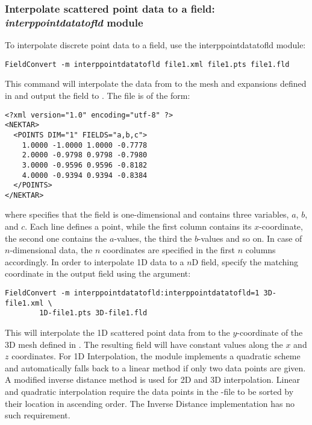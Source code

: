 \subsubsection{Interpolate scattered point data to a field: \textit{interppointdatatofld} module}
\label{s:utilities:fieldconvert:sub:interppointdatatofld}
To interpolate discrete point data to a field, use the interppointdatatofld module:
%
\begin{lstlisting}[style=BashInputStyle]
FieldConvert -m interppointdatatofld file1.xml file1.pts file1.fld
\end{lstlisting}
%
This command will interpolate the data from  to the mesh
and expansions defined in  and output the field to .
The file  is of the form:
%
\begin{lstlisting}[style=XMLStyle]
<?xml version="1.0" encoding="utf-8" ?>
<NEKTAR>
  <POINTS DIM="1" FIELDS="a,b,c">
    1.0000 -1.0000 1.0000 -0.7778
    2.0000 -0.9798 0.9798 -0.7980
    3.0000 -0.9596 0.9596 -0.8182
    4.0000 -0.9394 0.9394 -0.8384
  </POINTS>
</NEKTAR>
\end{lstlisting}
%
where  specifies that the field is one-dimensional
and contains three variables, $a$, $b$, and $c$.
Each line defines a point, while the  first column contains its $x$-coordinate,
the second one contains the $a$-values, the third the $b$-values and so on.
In case of $n$-dimensional data, the $n$ coordinates are specified in the first $n$
columns accordingly.
%
In order to interpolate 1D data to a $n$D field, specify the matching coordinate in
the output field using the  argument:
%
\begin{lstlisting}[style=BashInputStyle]
FieldConvert -m interppointdatatofld:interppointdatatofld=1 3D-file1.xml \
		1D-file1.pts 3D-file1.fld
\end{lstlisting}
%
This will interpolate the 1D scattered point data from  to the
$y$-coordinate of the 3D mesh defined in \inltt{3D-file1.xml}. The resulting field
will have constant values along the $x$ and $z$ coordinates.
For 1D Interpolation, the module implements a quadratic scheme and automatically 
falls back to a linear method if only two data points are given. 
A modified inverse distance method is used for 2D and 3D interpolation.
Linear and quadratic interpolation require the data points in the -file to be 
sorted by their location in ascending order. 
The Inverse Distance implementation has no such requirement.
%
%
%
